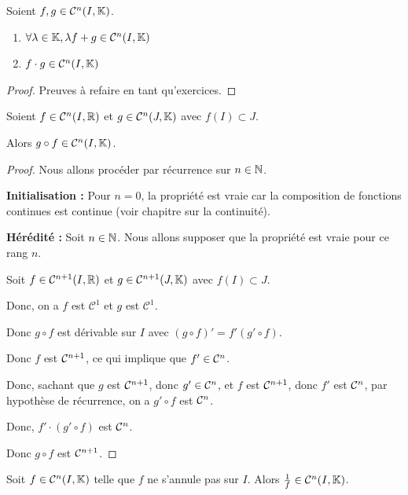 \documentclass[12pt, a4paper]{report}
\begin{document}
\begin{property}
    Soient $f,g \in \mathcal{C}^n(I,\mathbb{K})$.
    \begin{enumerate}
        \item $\forall \lambda \in \mathbb{K}, \lambda f + g \in \mathcal{C}^n(I,\mathbb{K})$
        \item $f\cdot g \in \mathcal{C}^n(I,\mathbb{K})$
    \end{enumerate}
\end{property}

\begin{proof}
  Preuves à refaire en tant qu'exercices.
\end{proof}

\begin{property}
  Soient $f\in\mathcal{C}^n(I,\mathbb{R})$ et $g\in\mathcal{C}^n(J,\mathbb{K})$ avec $f(I)\subset J$.

  \begin{importantbox}
    Alors $g\circ f \in \mathcal{C}^n(I,\mathbb{K})$.
  \end{importantbox}
\end{property}

\begin{proof}
  Nous allons procéder par récurrence sur $n\in\mathbb{N}$.

  \textbf{Initialisation :} Pour $n=0$, la propriété est vraie car la composition de fonctions continues est continue (voir chapitre sur la continuité).

  \textbf{Hérédité :} Soit $n\in\mathbb{N}$. Nous allons supposer que la propriété est vraie pour ce rang $n$.

  Soit $f\in\mathcal{C}^{n+1}(I,\mathbb{R})$ et $g\in\mathcal{C}^{n+1}(J,\mathbb{K})$ avec $f(I)\subset J$.

  Donc, on a $f$ est $\mathcal{C}^1$ et $g$ est $\mathcal{C}^1$.

  Donc $g\circ f$ est dérivable sur $I$ avec $(g\circ f)' = f' (g'\circ f)$.

  Donc $f$ est $\mathcal{C}^{n+1}$, ce qui implique que $f' \in \mathcal{C}^{n}$.

  Donc, sachant que $g$ est $\mathcal{C}^{n+1}$, donc $g' \in \mathcal{C}^{n}$, et $f$ est $\mathcal{C}^{n+1}$, donc $f'$ est $\mathcal{C}^{n}$, par hypothèse de récurrence, on a $g'\circ f$ est $\mathcal{C}^{n}$.

  Donc, $f'\cdot(g'\circ f)$ est $\mathcal{C}^{n}$.

  Donc $g\circ f$ est $\mathcal{C}^{n+1}$.
\end{proof}

\begin{property}
  Soit $f \in \mathcal{C}^{n}(I,\mathbb{K})$ telle que $f$ ne s'annule pas sur $I$. Alors $\frac1f \in \mathcal{C}^{n}(I,\mathbb{K})$.
\end{property}
\end{document}
